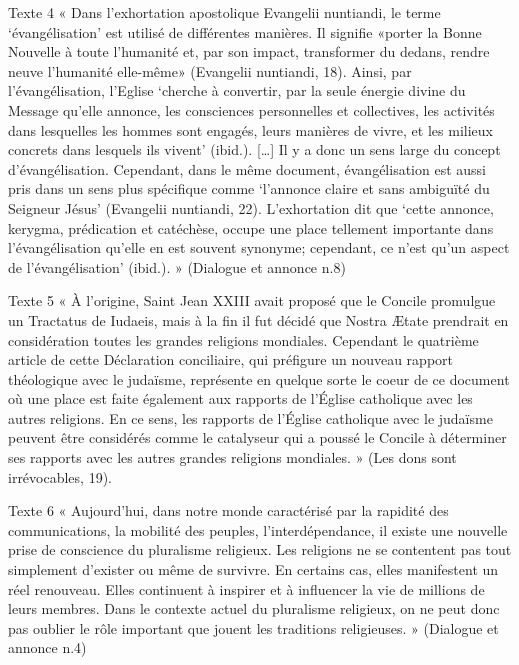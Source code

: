 Texte  4 «  Dans  l’exhortation  apostolique  Evangelii  nuntiandi,  le  terme  ‘évangélisation’  est  utilisé  de différentes  manières.  Il  signifie  «porter  la  Bonne  Nouvelle  à  toute  l’humanité  et,  par  son impact,  transformer  du  dedans,  rendre  neuve  l’humanité  elle-même»  (Evangelii  nuntiandi, 18).  Ainsi,  par  l’évangélisation,  l’Eglise  ‘cherche  à  convertir,  par  la  seule  énergie  divine  du Message  qu’elle  annonce,  les  consciences  personnelles  et  collectives,  les  activités  dans lesquelles  les  hommes  sont  engagés,  leurs  manières  de  vivre,  et  les  milieux  concrets  dans lesquels  ils  vivent’  (ibid.).  […]  Il  y  a  donc  un  sens  large  du  concept  d’évangélisation. Cependant,  dans  le  même  document,  évangélisation  est  aussi  pris  dans  un  sens  plus  spécifique comme  ‘l’annonce  claire  et  sans  ambiguïté  du  Seigneur  Jésus’  (Evangelii  nuntiandi,  22). L’exhortation  dit  que  ‘cette  annonce,  kerygma,  prédication  et  catéchèse,  occupe  une  place tellement  importante  dans  l’évangélisation  qu’elle  en  est  souvent  synonyme;  cependant,  ce n’est  qu’un aspect  de  l’évangélisation’  (ibid.).  »  (Dialogue  et  annonce  n.8) 

Texte  5 «  À  l’origine,  Saint  Jean  XXIII  avait  proposé  que  le  Concile  promulgue  un  Tractatus  de Iudaeis,  mais  à  la  fin  il  fut  décidé  que  Nostra  Ætate  prendrait  en  considération  toutes  les grandes  religions  mondiales.  Cependant  le  quatrième  article  de  cette  Déclaration  conciliaire, qui  préfigure  un  nouveau  rapport  théologique  avec  le  judaïsme,  représente  en  quelque  sorte  le coeur  de  ce  document  où  une  place  est  faite  également  aux  rapports  de  l’Église  catholique avec  les  autres  religions.  En  ce  sens,  les  rapports  de  l’Église  catholique  avec  le  judaïsme peuvent  être  considérés  comme  le  catalyseur  qui  a  poussé  le  Concile  à  déterminer  ses  rapports avec  les  autres  grandes  religions  mondiales.  »  (Les  dons  sont  irrévocables, 19).   


Texte  6 «  Aujourd’hui,  dans  notre  monde  caractérisé  par  la  rapidité  des  communications,  la  mobilité des  peuples,  l’interdépendance,  il  existe  une  nouvelle  prise  de  conscience  du  pluralisme religieux.  Les  religions  ne  se  contentent  pas  tout  simplement  d’exister  ou  même  de  survivre. En  certains  cas,  elles  manifestent  un  réel  renouveau.  Elles  continuent  à  inspirer  et  à  influencer la  vie  de  millions  de  leurs  membres.  Dans  le  contexte  actuel  du  pluralisme  religieux,  on  ne peut  donc  pas  oublier  le  rôle  important  que  jouent  les  traditions  religieuses.  »  (Dialogue  et annonce  n.4) 


